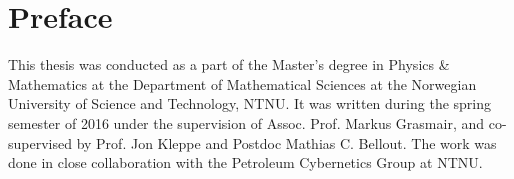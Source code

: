 
\cleardoublepage

\vspace*{\fill}
\noindent\begin{minipage}[c][]{\textwidth}
\section*{Preface} %
%
This thesis was conducted as a part of the 
Master's degree in Physics \& Mathematics
at the Department of Mathematical Sciences at
the Norwegian University of Science and Technology, 
NTNU. 
%
It was written during the spring semester of 
2016 under the supervision of Assoc. Prof. Markus 
Grasmair, and co-supervised by Prof. Jon Kleppe
and Postdoc Mathias C. Bellout. The work was
done in close collaboration with the Petroleum 
Cybernetics Group at NTNU.\\
%
\end{minipage}
\vspace*{\fill}

